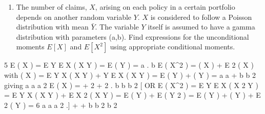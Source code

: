 \documentclass[a4paper,12pt]{article}
\begin{document}
\begin{enumerate}

\item The number of claims, $X$, arising on each policy in a certain portfolio depends on another random variable $Y$. $X$ is considered to follow a Poisson distribution with mean $\bar{Y}$. The variable $Y$ itself is assumed to have a gamma distribution with
parameters (a,b).
Find expressions for the unconditional moments $E[X]$ and $E[X^2]$ using appropriate conditional moments.


\end{enumerate}

5
E ( X ) = E Y { E X ( X Y ) } = E ( Y ) =
a
.
b
E ( X^2 ) = ( X ) + E 2 ( X )
with
( X ) = E Y {  X ( X Y ) } +  Y { E X ( X Y ) }
= E ( Y ) + ( Y ) =
a a
+
b b 2
giving
a a a 2
E ( X ) = + 2 + 2 .
b b
b
2
{
{ 
}
[ OR E ( X^2 ) = E Y E X ( X 2 Y )
= E Y
X
}
( X Y ) + E X 2 ( X Y ) = E ( Y ) + E ( Y 2 )
= E ( Y ) + ( Y ) + E 2 ( Y )
=
6
a a a 2
.]
+ +
b b 2 b 2
\end{document}
